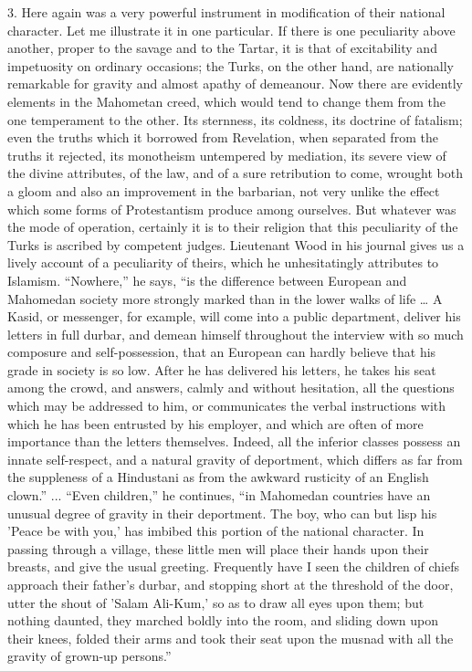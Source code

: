 3. Here again was a very
powerful instrument in modification of their national character. Let
me illustrate it in one particular. If there is one peculiarity above
another, proper to the savage and to the Tartar, it is that of
excitability and impetuosity on ordinary occasions; the Turks, on the
other hand, are nationally remarkable for gravity and almost apathy of
demeanour. Now there are evidently elements in the Mahometan creed,
which would tend to change them from the one temperament to the
other. Its sternness, its coldness, its doctrine of fatalism; even the
truths which it borrowed from Revelation, when separated from the
truths it rejected, its monotheism untempered by mediation, its severe
view of the divine attributes, of the law, and of a sure retribution
to come, wrought both a gloom and also an improvement in the
barbarian, not very unlike the effect which some forms of
Protestantism produce among ourselves. But whatever was the mode of
operation, certainly it is to their religion that this peculiarity of
the Turks is ascribed by competent judges. Lieutenant Wood in his
journal gives us a lively account of a peculiarity of theirs, which he
unhesitatingly attributes to Islamism. ``Nowhere,'' he says, ``is the
difference between European and Mahomedan society more strongly marked
than in the lower walks of life … A Kasid, or messenger, for
example, will come into a public department, deliver his letters in
full durbar, and demean himself throughout the interview with so much
composure and self-possession, that an European can hardly believe
that his grade in society is so low. After he has delivered his
letters, he takes his seat among the crowd, and answers, calmly and
without hesitation, all the questions which may be addressed to him,
or communicates the verbal instructions with which he has been
entrusted by his employer, and which are often of more importance than
the letters themselves. Indeed, all the inferior classes possess an
innate self-respect, and a natural gravity of deportment, which
differs as far from the suppleness of a Hindustani as from the awkward
rusticity of an English clown.'' ... ``Even children,'' he continues, ``in
Mahomedan countries have an unusual degree of gravity in their
deportment. The boy, who can but lisp his 'Peace be with you,' has
imbibed this portion of the national character. In passing
through a village, these little men will place their hands upon their
breasts, and give the usual greeting. Frequently have I seen the
children of chiefs approach their father's durbar, and stopping short
at the threshold of the door, utter the shout of 'Salam Ali-Kum,' so
as to draw all eyes upon them; but nothing daunted, they marched
boldly into the room, and sliding down upon their knees, folded their
arms and took their seat upon the musnad with all the gravity of
grown-up persons.''

